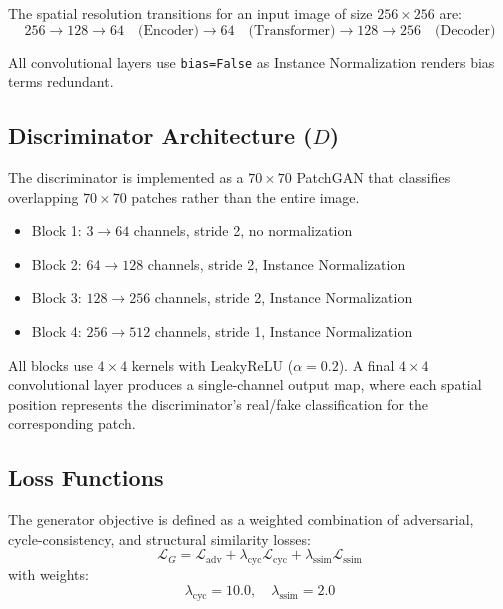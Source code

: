 \documentclass[conference]{IEEEtran}
\begin{document}
The spatial resolution transitions for an input image of size $256 \times 256$ are:
$$256 \rightarrow 128 \rightarrow 64 \quad \text{(Encoder)} \rightarrow 64 \quad \text{(Transformer)} \rightarrow 128 \rightarrow 256 \quad \text{(Decoder)}$$

All convolutional layers use \texttt{bias=False} as Instance Normalization renders bias terms redundant.

\subsection{Discriminator Architecture ($D$)}

The discriminator is implemented as a $70 \times 70$ PatchGAN \cite{isola2017} that classifies overlapping $70 \times 70$ patches rather than the entire image.

\begin{itemize}
    \item Block 1: $3 \rightarrow 64$ channels, stride 2, no normalization
    \item Block 2: $64 \rightarrow 128$ channels, stride 2, Instance Normalization
    \item Block 3: $128 \rightarrow 256$ channels, stride 2, Instance Normalization
    \item Block 4: $256 \rightarrow 512$ channels, stride 1, Instance Normalization
\end{itemize}

All blocks use $4 \times 4$ kernels with LeakyReLU ($\alpha = 0.2$). A final $4 \times 4$ convolutional layer produces a single-channel output map, where each spatial position represents the discriminator's real/fake classification for the corresponding patch.

\subsection{Loss Functions}

The generator objective is defined as a weighted combination of adversarial, cycle-consistency, and structural similarity losses:
\begin{equation}
\mathcal{L}_G = \mathcal{L}_{\text{adv}} + \lambda_{\text{cyc}} \mathcal{L}_{\text{cyc}} + \lambda_{\text{ssim}} \mathcal{L}_{\text{ssim}}
\end{equation}
with weights:
\begin{equation}
\lambda_{\text{cyc}} = 10.0, \quad \lambda_{\text{ssim}} = 2.0
\end{equation}
\end{document}
